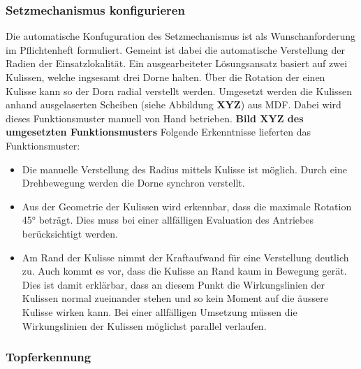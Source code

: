 \subsubsection{Setzmechanismus konfigurieren}
Die automatische Konfuguration des Setzmechanismus ist als Wunschanforderung im Pflichtenheft formuliert. Gemeint ist dabei die automatische Verstellung der Radien der Einsatzlokalität. Ein ausgearbeiteter Lösungsansatz basiert auf zwei Kulissen, welche ingsesamt drei Dorne halten. Über die Rotation der einen Kulisse kann so der Dorn radial verstellt werden. Umgesetzt werden die Kulissen anhand ausgelaserten Scheiben (siehe Abbildung \textbf{XYZ}) aus MDF. Dabei wird dieses Funktionsmuster manuell von Hand betrieben.
\newline
\textbf{Bild XYZ des umgesetzten Funktionsmusters}
\newline
Folgende Erkenntnisse lieferten das Funktionsmuster:
\begin{itemize}
	\item Die manuelle Verstellung des Radius mittels Kulisse ist möglich. Durch eine Drehbewegung werden die Dorne synchron verstellt.
	
	\item Aus der Geometrie der Kulissen wird erkennbar, dass die maximale Rotation 45° beträgt. Dies muss bei einer allfälligen Evaluation des Antriebes berücksichtigt werden.
	
	\item Am Rand der Kulisse nimmt der Kraftaufwand für eine Verstellung deutlich zu. Auch kommt es vor, dass die Kulisse an Rand kaum in Bewegung gerät. Dies ist damit erklärbar, dass an diesem Punkt die Wirkungslinien der Kulissen normal zueinander stehen und so kein Moment auf die äussere Kulisse wirken kann. Bei einer allfälligen Umsetzung müssen die Wirkungslinien der Kulissen möglichst parallel verlaufen. 
\end{itemize} 
\subsubsection{Topferkennung}